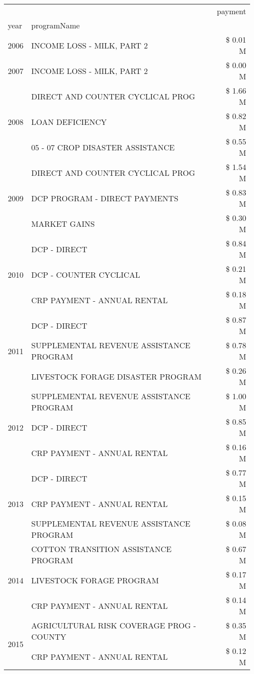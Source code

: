 \begin{tabular}{llr}
\toprule
 &  & payment \\
year & programName &  \\
\midrule
2006 & INCOME LOSS - MILK, PART 2 & \$ 0.01 M \\
\cline{1-3}
2007 & INCOME LOSS - MILK, PART 2 & \$ 0.00 M \\
\cline{1-3}
\multirow[t]{3}{*}{2008} & DIRECT AND COUNTER CYCLICAL PROG & \$ 1.66 M \\
 & LOAN DEFICIENCY & \$ 0.82 M \\
 & 05 - 07 CROP DISASTER ASSISTANCE & \$ 0.55 M \\
\cline{1-3}
\multirow[t]{3}{*}{2009} & DIRECT AND COUNTER CYCLICAL PROG & \$ 1.54 M \\
 & DCP PROGRAM - DIRECT PAYMENTS & \$ 0.83 M \\
 & MARKET GAINS & \$ 0.30 M \\
\cline{1-3}
\multirow[t]{3}{*}{2010} & DCP - DIRECT & \$ 0.84 M \\
 & DCP - COUNTER CYCLICAL & \$ 0.21 M \\
 & CRP PAYMENT - ANNUAL RENTAL & \$ 0.18 M \\
\cline{1-3}
\multirow[t]{3}{*}{2011} & DCP - DIRECT & \$ 0.87 M \\
 & SUPPLEMENTAL REVENUE ASSISTANCE PROGRAM & \$ 0.78 M \\
 & LIVESTOCK FORAGE DISASTER PROGRAM & \$ 0.26 M \\
\cline{1-3}
\multirow[t]{3}{*}{2012} & SUPPLEMENTAL REVENUE ASSISTANCE PROGRAM & \$ 1.00 M \\
 & DCP - DIRECT & \$ 0.85 M \\
 & CRP PAYMENT - ANNUAL RENTAL & \$ 0.16 M \\
\cline{1-3}
\multirow[t]{3}{*}{2013} & DCP - DIRECT & \$ 0.77 M \\
 & CRP PAYMENT - ANNUAL RENTAL & \$ 0.15 M \\
 & SUPPLEMENTAL REVENUE ASSISTANCE PROGRAM & \$ 0.08 M \\
\cline{1-3}
\multirow[t]{3}{*}{2014} & COTTON TRANSITION ASSISTANCE PROGRAM & \$ 0.67 M \\
 & LIVESTOCK FORAGE PROGRAM & \$ 0.17 M \\
 & CRP PAYMENT - ANNUAL RENTAL & \$ 0.14 M \\
\cline{1-3}
\multirow[t]{3}{*}{2015} & AGRICULTURAL RISK COVERAGE PROG - COUNTY & \$ 0.35 M \\
 & CRP PAYMENT - ANNUAL RENTAL & \$ 0.12 M \\

\end{tabular}
